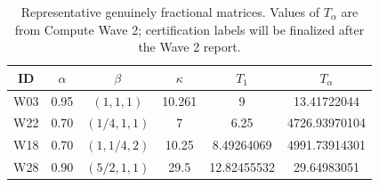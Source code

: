 \begin{table}[ht]
\centering
\small
\caption{Representative genuinely fractional matrices. Values of \(T_\alpha\) are from Compute Wave 2; certification labels will be finalized after the Wave 2 report.}
\label{tab:canonical-witnesses}
\begin{tabular}{c c c c c c}
\toprule
ID & \(\alpha\) & \(\beta\) & \(\kappa\) & \(T_1\) & \(T_\alpha\)\\
\midrule
W03 & 0.95 & \((1,1,1)\) & 10.261 & 9 & 13.41722044\\
W22 & 0.70 & \((1/4,1,1)\) & 7 & 6.25 & 4726.93970104\\
W18 & 0.70 & \((1,1/4,2)\) & 10.25 & 8.49264069 & 4991.73914301\\
W28 & 0.90 & \((5/2,1,1)\) & 29.5 & 12.82455532 & 29.64983051\\
\bottomrule
\end{tabular}
\end{table}

%
%
%
%
